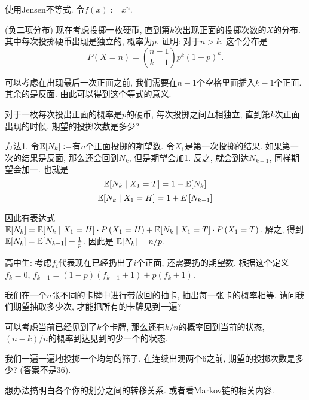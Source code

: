 \begin{solution*}
    使用Jensen不等式. 令$f(x):=x^n$. 
\end{solution*}

\begin{exercise}
    (负二项分布) 现在考虑投掷一枚硬币, 直到第$k$次出现正面的投掷次数的$X$的分布. 其中每次投掷硬币出现是独立的, 概率为$p$. 证明: 对于$n>k$, 这个分布是
    $$
    P(X=n) = \binom{n-1}{k-1}p^k(1-p)^k.
    $$
\end{exercise}

\begin{solution*}
    可以考虑在出现最后一次正面之前, 我们需要在$n-1$个空格里面插入$k-1$个正面. 其余的是反面. 由此可以得到这个等式的意义. 
\end{solution*}

\begin{exercise}
    对于一枚每次投出正面的概率是$p$的硬币, 每次投掷之间互相独立, 直到第$k$次正面出现的时候, 期望的投掷次数是多少? 
\end{exercise}

\begin{solution*}

    方法1. 令$\mathbb E[N_k]:=$有$n$个正面投掷的期望数. 令$X_1$是第一次投掷的结果. 如果第一次的结果是反面, 那么还会回到$N_k$, 但是期望会加1. 反之, 就会到达$N_{k-1}$, 同样期望会加一. 也就是
    $$
\mathbb E[N_k \mid X_1=T]=1+\mathbb E[N_k]
$$
$$
\mathbb E[N_k \mid X_1=H]=1+E\left[N_{k-1}\right]
$$

因此有表达式$\mathbb E[N_k]=\mathbb E[N_k \mid X_1=H] \cdot P\left(X_1=H\right)+\mathbb E[N_k \mid X_1=T] \cdot P\left(X_1=T\right)$. 解之, 得到$\mathbb E[N_k]=\mathbb E[N_{k-1}]+\frac{1}{p}$. 因此是 $\mathbb E[N_k]=n/p$.

    高中生: 考虑$f_i$代表现在已经扔出了$i$个正面, 还需要扔的期望数. 根据这个定义$f_k=0$, $f_{k-1}=(1-p)(f_{k-1}+1)+p(f_k+1)$. 

\end{solution*}


\begin{exercise}
    我们在一个$n$张不同的卡牌中进行带放回的抽卡, 抽出每一张卡的概率相等. 请问我们期望抽取多少次, 才能把所有的卡牌见到一遍? 
\end{exercise}

\begin{solution*}
    可以考虑当前已经见到了$k$个卡牌, 那么还有$k/n$的概率回到当前的状态, $(n-k)/n$的概率到达见到的少一个的状态. 
\end{solution*}

\begin{exercise}
    我们一遍一遍地投掷一个均匀的筛子. 在连续出现两个6之前, 期望的投掷次数是多少? (答案不是36).
\end{exercise}
\begin{solution*}
    想办法搞明白各个你的划分之间的转移关系. 或者看Markov链的相关内容. 
\end{solution*}


